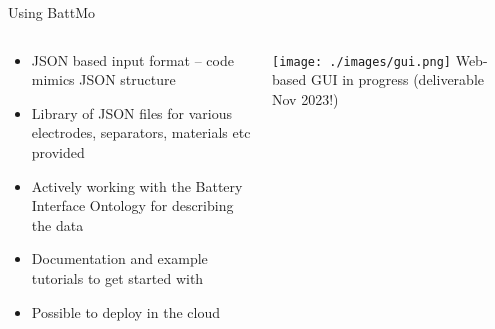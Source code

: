 \documentclass{beamer}
\begin{document}
\begin{frame}{Using BattMo}

  \begin{columns}
    \begin{column}{0.4\textwidth}
      \begin{itemize}
      \item JSON based input format -- code mimics JSON structure
      \item Library of JSON files for various electrodes, separators, materials etc provided  %
      \item Actively working with the Battery Interface Ontology for describing the data
      \item Documentation and example
        tutorials to get started with
      \item Possible to deploy in the cloud
      \end{itemize}
    \end{column}
    \begin{column}{0.7\textwidth}
      \centering
      \texttt{[image: ./images/gui.png]}
      \footnotesize
      Web-based GUI in progress (deliverable Nov 2023!)
    \end{column}
  \end{columns}




\end{frame}





\end{document}
